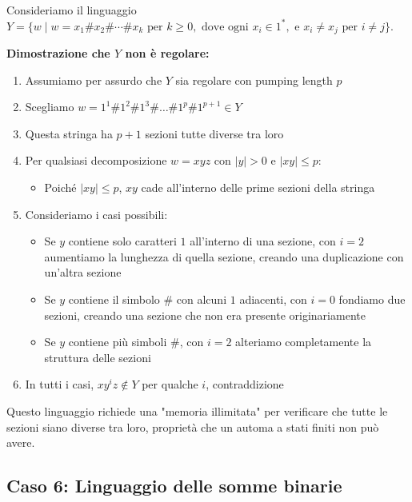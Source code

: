 \documentclass[12pt,a4paper]{article}
\begin{document}
\begin{risoluzione}
Consideriamo il linguaggio $Y = \{w\mid w = x_1\#x_2\# \cdots \#x_k \text{ per } k \geq 0, \text{ dove ogni } x_i \in 1^*, \text{ e } x_i \neq x_j \text{ per } i \neq j\}$.

\textbf{Dimostrazione che $Y$ non è regolare:}
\begin{enumerate}
    \item Assumiamo per assurdo che $Y$ sia regolare con pumping length $p$
    \item Scegliamo $w = 1^1\#1^2\#1^3\#\ldots\#1^p\#1^{p+1} \in Y$
    \item Questa stringa ha $p+1$ sezioni tutte diverse tra loro
    \item Per qualsiasi decomposizione $w = xyz$ con $|y| > 0$ e $|xy| \leq p$:
    \begin{itemize}
        \item Poiché $|xy| \leq p$, $xy$ cade all'interno delle prime sezioni della stringa
    \end{itemize}
    \item Consideriamo i casi possibili:
    \begin{itemize}
        \item Se $y$ contiene solo caratteri $1$ all'interno di una sezione, con $i = 2$ aumentiamo la lunghezza di quella sezione, creando una duplicazione con un'altra sezione
        \item Se $y$ contiene il simbolo $\#$ con alcuni $1$ adiacenti, con $i = 0$ fondiamo due sezioni, creando una sezione che non era presente originariamente
        \item Se $y$ contiene più simboli $\#$, con $i = 2$ alteriamo completamente la struttura delle sezioni
    \end{itemize}
    \item In tutti i casi, $xy^iz \not\in Y$ per qualche $i$, contraddizione
\end{enumerate}
\end{risoluzione}

\begin{concettochiave}
Questo linguaggio richiede una "memoria illimitata" per verificare che tutte le sezioni siano diverse tra loro, proprietà che un automa a stati finiti non può avere.
\end{concettochiave}

\subsection{Caso 6: Linguaggio delle somme binarie}
\end{document}
